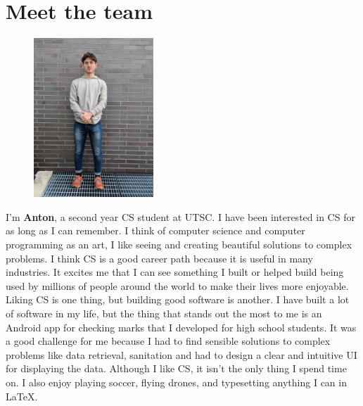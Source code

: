 \documentclass[12pt]{scrreprt}
\begin{document}
\section{Meet the team}
\begin{figure} 
	\includegraphics[angle=-90,origin=c,width=0.4\textwidth]{anton}
\end{figure} 
I'm \textbf{Anton}, a second year CS student at UTSC. I have been interested in CS for as long as I can remember. I think of computer science and computer programming as an art, I like seeing and creating beautiful solutions to complex problems. I think CS is a good career path because it is useful in many industries. It excites me that I can see something I built or helped build being used by millions of people around the world to make their lives more enjoyable. Liking CS is one thing, but building good software is another. I have built a lot of software in my life, but the thing that stands out the most to me is an Android app for checking marks that I developed for high school students. It was a good challenge for me because I had to find sensible solutions to complex problems like data retrieval, sanitation and had to design a clear and intuitive UI for displaying the data. Although I like CS, it isn't the only thing I spend time on. I also enjoy playing soccer, flying drones, and typesetting anything I can in \LaTeX.\\
\end{document}
